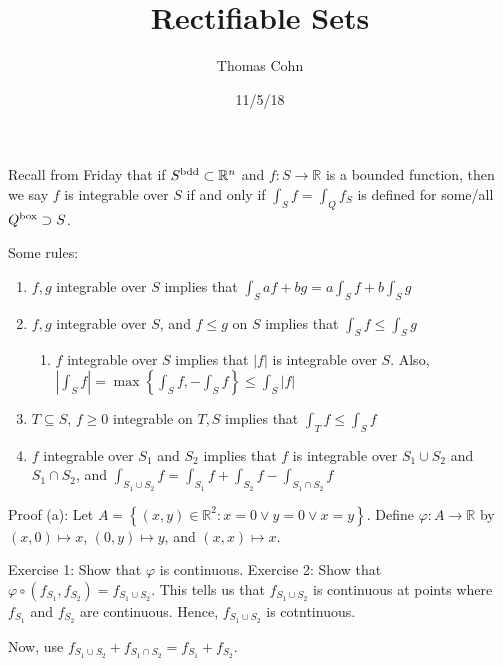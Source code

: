 \documentclass[10pt,letterpaper]{article}
\author{Thomas Cohn}
\title{Rectifiable Sets}
\date{11/5/18} %
\newcommand{\n}{\hfill\break}
\newcommand{\ptxt}[1]{\textrm{\textnormal{#1}}}
\newcommand{\set}[1]{\left\{#1\right\}}
\newcommand{\reals}{\mathbb{R}}
\newcommand{\R}{\reals}
\newcommand{\abs}[1]{\left|#1\right|}
\newcommand{\of}{\circ}
\begin{document}
\maketitle
\setlength\RaggedRightParindent{\parindent}
\RaggedRight

\par\noindent Recall from Friday that if $S^{\ptxt{bdd}}\subset\R^{n}$ and $f:S\to\R$ is a bounded function, then we say $f$ is integrable over $S$ if and only if $\int_{S}f=\int_{Q}f_{S}$ is defined for some/all $Q^{\ptxt{box}}\supset{}S$.\n

\par\noindent Some rules:
\begin{enumerate}[label=(\alph*)]
	\item $f,g$ integrable over $S$ implies that $\displaystyle\int_{S}af+bg=a\int_{S}f+b\int_{S}g$
	\item $f,g$ integrable over $S$, and $f\le{}g$ on $S$ implies that $\displaystyle\int_{S}f\le\int_{S}g$
	\begin{enumerate}[label=(\alph*$'$),start=2]
		\item $f$ integrable over $S$ implies that $\abs{f}$ is integrable over $S$.\n
		Also, $\displaystyle\abs{\int_{S}f}=\max\set{\int_{S}f,-\int_{S}f}\le\int_{S}\abs{f}$
	\end{enumerate}
	\item $T\subseteq{}S$, $f\ge{}0$ integrable on $T,S$ implies that $\displaystyle\int_{T}f\le\int_{S}f$
	\item $f$ integrable over $S_{1}$ and $S_{2}$ implies that $f$ is integrable over $S_{1}\cup{}S_{2}$ and $S_{1}\cap{}S_{2}$, and\n
	$\displaystyle\int_{S_{1}\cup{}S_{2}}f=\int_{S_{1}}f+\int_{S_{2}}f-\int_{S_{1}\cap{}S_{2}}f$
\end{enumerate}

\par\noindent Proof (a): Let $A=\set{(x,y)\in\R^{2}:x=0\lor{}y=0\lor{}x=y}$. Define $\varphi:A\to\R$ by $(x,0)\mapsto{}x$, $(0,y)\mapsto{}y$, and $(x,x)\mapsto{}x$.\n

\par\noindent Exercise 1: Show that $\varphi$ is continuous.\n
Exercise 2: Show that $\varphi\of(f_{S_{1}},f_{S_{2}})=f_{S_{1}\cup{}S_{2}}$. This tells us that $f_{S_{1}\cup{}S_{2}}$ is continuous at points where $f_{S_{1}}$ and $f_{S_{2}}$ are continuous. Hence, $f_{S_{1}\cup{}S_{2}}$ is cotntinuous.\n

\par\noindent Now, use $f_{S_{1}\cup{}S_{2}}+f_{S_{1}\cap{}S_{2}}=f_{S_{1}}+f_{S_{2}}$.\n
\end{document}
